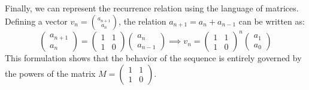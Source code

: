 Finally, we can represent the recurrence relation using the language of matrices. Defining a vector $v_n = \binom{a_{n+1}}{a_n}$, the relation $a_{n+1} = a_n + a_{n-1}$ can be written as:
\begin{equation}
\begin{pmatrix} a_{n+1} \\ a_n \end{pmatrix} = \begin{pmatrix} 1 & 1 \\ 1 & 0 \end{pmatrix} \begin{pmatrix} a_n \\ a_{n-1} \end{pmatrix} \implies v_n = \begin{pmatrix} 1 & 1 \\ 1 & 0 \end{pmatrix}^n \begin{pmatrix} a_1 \\ a_0 \end{pmatrix}
\end{equation}
This formulation shows that the behavior of the sequence is entirely governed by the powers of the matrix $M = \left(\begin{smallmatrix} 1 & 1 \\ 1 & 0 \end{smallmatrix}\right)$.


